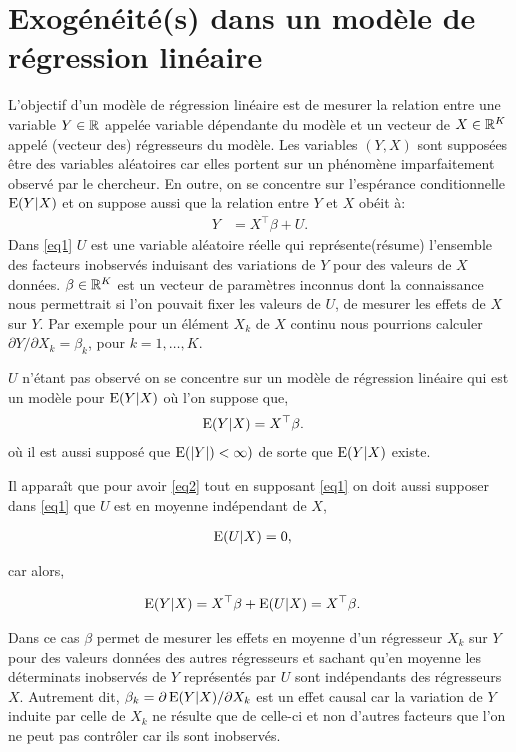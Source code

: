 \newpage

\tableofcontents

\newpage

\section{Exogénéité(s) dans un modèle de régression linéaire}
L'objectif d'un modèle de régression linéaire est de mesurer la relation entre une variable $Y\in\mathbb{R}$ 
appelée variable dépendante du modèle et un vecteur de $X\in\mathbb{R}^K$ appelé (vecteur des) régresseurs du modèle. 
Les variables $(Y, X)$ sont supposées être des variables aléatoires car elles portent sur un phénomène imparfaitement 
observé par le chercheur. En outre, on se concentre sur l'espérance conditionnelle $\operatorname{E}(Y|X)$ et on suppose aussi
que la relation entre $Y$ et $X$ obéit à:
\begin{align}
	Y &= X^\top \beta + U.
	\label{eq1}
\end{align}
Dans \eqref{eq1} $U$ est une variable aléatoire réelle qui représente(résume) l'ensemble des facteurs inobservés 
induisant des variations de $Y$ pour des valeurs de $X$ données. $\beta\in\mathbb{R}^K$ est 
un vecteur de paramètres inconnus dont la connaissance nous permettrait 
si l'on pouvait fixer les valeurs de $U$, de mesurer les effets de $X$ sur $Y$. Par exemple pour un élément $X_k$ 
de $X$ continu nous pourrions calculer $\partial Y/\partial X_k = \beta_k$, pour $k = 1, \ldots, K$.

$U$ n'étant pas observé on se concentre sur un modèle de régression linéaire qui est un modèle pour $\operatorname{E}(Y|X)$ 
où l'on suppose que,
\begin{align}
	\operatorname{E}(Y|X) &= X^\top \beta.
	\label{eq2}
\end{align}
où il est aussi  supposé que $\operatorname{E}(\left\vert {Y} \right\vert) < \infty)$ de sorte que $\operatorname{E}(Y|X)$ existe.

Il apparaît que pour avoir \eqref{eq2} tout en supposant \eqref{eq1} on doit 
aussi supposer dans \eqref{eq1} que $U$ est en moyenne indépendant de $X$,

\begin{align}
\operatorname{E}(U|X) &=0,
\label{eq3}
\end{align}

 car alors,

\begin{align*}
	\operatorname{E}(Y|X)&=X^\top\beta +\operatorname{E}(U|X) = X^\top\beta.
\end{align*}

Dans ce cas $\beta$ permet de mesurer les effets en moyenne d'un régresseur $X_k$ sur $Y$ pour 
des valeurs données des autres régresseurs et sachant qu'en moyenne 
les déterminats inobservés de $Y$ représentés par $U$ sont indépendants des régresseurs $X$. Autrement dit,
$\beta_k = \partial \operatorname{E}(Y|X)/\partial X_k$ est un effet causal car la variation de $Y$ induite par celle de $X_k$
ne résulte que de celle-ci et non d'autres facteurs que l'on ne peut pas contrôler car ils sont inobservés.

